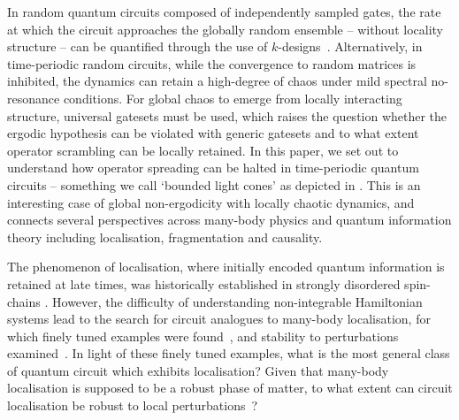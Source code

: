\documentclass[11pt, twocolumn, floatfix, superscriptaddress, aps, prb, raggedbottom]{revtex4-2}
\newcommand\lluis[1]{\textcolor{brown}{#1}}
\begin{document}

In random quantum circuits composed of independently sampled gates, the rate at which the circuit approaches the globally random ensemble -- without locality structure -- can be quantified through the use of $k$-designs~\cite{Roberts2017, Brandao2016, Harrow2009, Haferkamp2022}.
Alternatively, in time-periodic random circuits, while the convergence to random matrices is inhibited, the dynamics can retain a high-degree of chaos \cite{Roberts2017,Pilatowsky-Cameo2024_CHSE_CUE, Mark_2024_prx} under mild spectral no-resonance conditions.
For global chaos to emerge from locally interacting structure, universal gatesets must be used, which raises the question whether the ergodic hypothesis can be violated with generic gatesets and to what extent operator scrambling can be locally retained.
In this paper, we set out to understand how operator spreading can be halted in time-periodic quantum circuits -- something we call \enquote*{bounded light cones} as depicted in .
This is an interesting case of global non-ergodicity with locally chaotic dynamics, and connects several perspectives across many-body physics and quantum information theory including localisation, fragmentation and causality.

The phenomenon of localisation, where initially encoded quantum information is retained at late times, was historically established in strongly disordered spin-chains \cite{Anderson1958, Basko2006, Abanin2019Colloquium:Entanglement}.
However, the difficulty of understanding non-integrable Hamiltonian systems lead to the search for circuit analogues to many-body localisation, for which finely tuned examples were found~\cite{Chandran2015, Farshi2022_1D, Farshi2022_2D, Bertini2022_strongly_localised_circuits, Kovacs2026}, and stability to perturbations examined~\cite{Kovacs2026}.
In light of these finely tuned examples, what is the most general class of quantum circuit which exhibits localisation?
Given that many-body localisation is supposed to be a robust phase of matter, to what extent can circuit localisation be robust to local perturbations~\cite{Kovacs2026}? 
\end{document}
